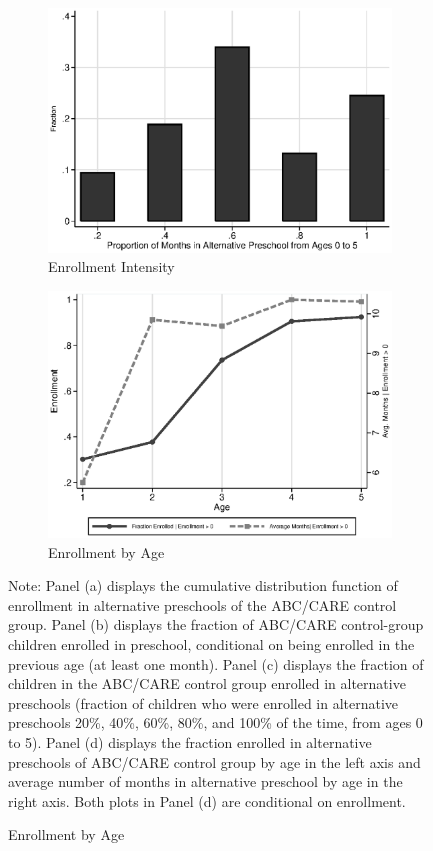 \begin{figure}
\begin{subfigure}[h]{0.4\textwidth}
	\centering
	\caption{Enrollment Intensity} \label{fig:proportion-alt-pre}
		\includegraphics[width=\textwidth]{output/abccare_Vfractimes.eps}
\end{subfigure}%
\begin{subfigure}[h]{0.4\textwidth}
	\centering
	\caption{Enrollment by Age} \label{fig:salmonella}
		\includegraphics[width=\textwidth]{output/abccare_Valtenrollment.eps}
\end{subfigure}

\footnotesize \justify
Note: Panel (a) displays the cumulative distribution function of enrollment in alternative preschools of the ABC/CARE control group. Panel (b) displays the fraction of ABC/CARE control-group children enrolled in preschool, conditional on being enrolled in the previous age (at least one month). Panel (c) displays the fraction of children in the ABC/CARE control group enrolled in alternative preschools (fraction of children who were enrolled in alternative preschools 20\%, 40\%, 60\%, 80\%, and 100\% of the time, from ages 0 to 5). Panel (d) displays the fraction enrolled in alternative preschools of ABC/CARE control group by age in the left axis and average number of months in alternative preschool by age in the right axis. Both plots in Panel (d) are conditional on enrollment.\\
\end{figure}

